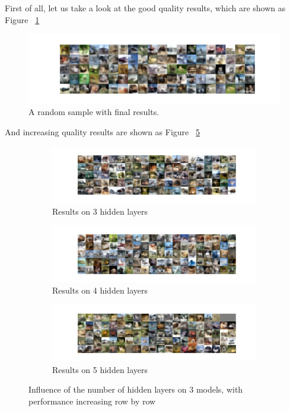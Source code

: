 \documentclass[12pt,letterpaper]{article}
\begin{document}
First of all, let us take a look at the good quality results, which are shown as Figure ~\ref{fig:CIFAR_VAE_hidden_results} 

\begin{figure}[h]
    \centering
    \includegraphics[width=.8\linewidth]{VAE_CIFAR_0_100_256results.png}
    \caption{\small A random sample with final results.}
    \label{fig:CIFAR_VAE_hidden_results}
\end{figure}

And increasing quality results are shown as Figure ~\ref{fig:CIFAR_VAE_hidden}

\begin{figure}[h]
    \begin{subfigure}{0.49\textwidth}
    \includegraphics[width=\linewidth]{VAE_CIFAR_0_50_256.png}
    \caption{\small Results on 3 hidden layers} \label{fig:a}
    \end{subfigure}\hspace*{\fill}
    \begin{subfigure}{0.49\textwidth}
    \includegraphics[width=\linewidth]{VAE_CIFAR_1_50_256.png}
    \caption{\small Results on 4 hidden layers} \label{fig:b}
    \end{subfigure}

    \medskip
    \begin{subfigure}{0.49\textwidth}
    \includegraphics[width=\linewidth]{VAE_CIFAR_2_50_256.png}
    \caption{\small Results on 5 hidden layers} \label{fig:c}
    \end{subfigure}\hspace*{\fill}
    \caption{Influence of the number of hidden layers on $3$ models, with performance increasing row by row} \label{fig:CIFAR_VAE_hidden}
\end{figure}
\end{document}
